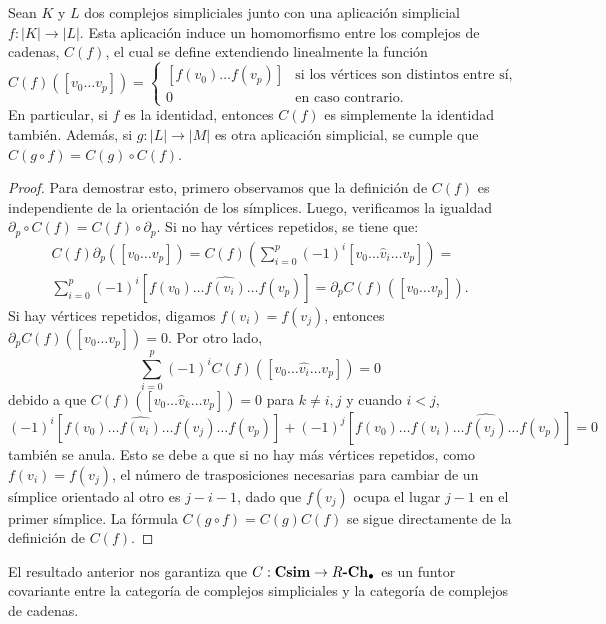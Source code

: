 \begin{proposicion}
	\label{prop:simpl_app_hom} Sean $K$ y $L$ dos complejos simpliciales junto con
	una aplicación simplicial $f: |K| \to |L|$. Esta aplicación induce un
	homomorfismo entre los complejos de cadenas, $C(f)$, el cual se define
	extendiendo linealmente la función
	\[
	C(f)([v_{0}\ldots v_{p}]) =
	\begin{cases}
		[f(v_{0}) \ldots f(v_{p})] & \text{si los vértices son distintos entre sí}, \\
		0                          & \text{en caso contrario}.
	\end{cases}
	\]
	En particular, si $f$ es la identidad, entonces $C(f)$ es simplemente la
	identidad también. Además, si $g: |L| \longrightarrow |M|$ es otra aplicación
	simplicial, se cumple que $C(g \circ f) = C(g) \circ C(f)$.
\end{proposicion}
\begin{proof}
	Para demostrar esto, primero observamos que la definición de $C(f)$ es
	independiente de la orientación de los símplices. Luego, verificamos la
	igualdad $\partial_{p}\circ C(f) = C(f) \circ \partial_{p}$. Si no hay vértices
	repetidos, se tiene que:
	\begin{gather*}
		C(f) \partial_{p}([v_{0}\ldots v_{p}]) = C(f) \left( \sum_{i=0}^{p}(-1)^{i}[v
		_{0}\ldots \hat{v}_{i}\ldots v_{p}] \right) = \\ \sum_{i=0}^{p}(-1)^{i}[f(v_{0}
		) \ldots \widehat{f(v_i)}\ldots f(v_{p})] = \partial_{p}C(f)([v_{0}\ldots v_{p}
		]).
	\end{gather*}
	Si hay vértices repetidos, digamos $f(v_{i}) = f(v_{j})$, entonces $\partial_{p}
	C(f)([v_{0}\ldots v_{p}]) = 0$. Por otro lado,
	\[
	\sum_{i=0}^{p}(-1)^{i}C(f)([v_{0}\ldots \hat{v_i}\ldots v_{p}]) = 0
	\]
	debido a que $C(f)([v_{0}\ldots \hat{v}_{k}\ldots v_{p}]) = 0$ para $k \neq i,j$
	y cuando $i < j$,
	\[
	(-1)^{i}[f(v_{0}) \ldots \widehat{f(v_i)}\ldots f(v_{j}) \ldots f(v_{p})] + (
	-1)^{j}[f(v_{0}) \ldots f(v_{i}) \ldots \widehat{f(v_j)}\ldots f(v_{p})] = 0
	\]
	también se anula. Esto se debe a que si no hay más vértices repetidos, como
	$f(v_{i}) = f(v_{j})$, el número de trasposiciones necesarias para cambiar de un
	símplice orientado al otro es $j-i-1$, dado que $f(v_{j})$ ocupa el lugar
	$j-1$ en el primer símplice. La fórmula $C(g \circ f)=C(g)C(f)$ se sigue directamente
	de la definición de $C(f)$.
\end{proof}
\begin{observacion}
	El resultado anterior nos garantiza que $C: \mathbf{Csim}\to R \textbf{-}\mathbf{Ch_\bullet}$
	es un funtor covariante entre la categoría de complejos simpliciales y la categoría
	de complejos de cadenas.
\end{observacion}

